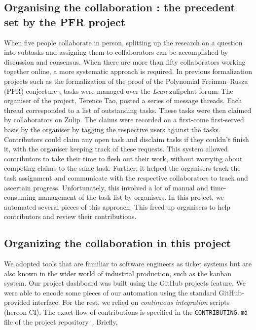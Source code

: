 \subsection{Organising the collaboration : the precedent set by the PFR project}
When five people collaborate in person, splitting up the research on a question into subtasks and assigning them to collaborators can be accomplished by discussion and consensus. When there are more than fifty collaborators working together online, a more systematic approach is required. In previous formalization projects such as the formalization of the proof of the Polynomial Freiman--Rusza (PFR) conjecture \cite{PFR_Tao_Dilles_2023}, tasks were managed over the \emph{Lean} zulipchat forum. The organiser of the project, Terence Tao, posted a series of message threads. Each thread corresponded to a list of outstanding tasks. These tasks were then claimed by collaborators on Zulip. The claims were recorded on a first-come first-served basis by the organiser by tagging the respective users against the tasks. Contributors could claim any open task and disclaim tasks if they couldn't finish it, with the organiser keeping track of these requests. This system allowed contributors to take their time to flesh out their work, without worrying about competing claims to the same task. Further, it helped the organisers track the task assignment and communicate with the respective collaborators to track and ascertain progress. Unfortunately, this involved a lot of manual and time-consuming management of the task list by organisers. In this project, we automated several pieces of this approach. This freed up organisers to help contributors and review their contributions.

\subsection{Organizing the collaboration in this project}
We adopted tools that are familiar to software engineers as ticket systems but are also known in the wider world of industrial production, such as the kanban system. Our project dashboard was built using the GitHub projects feature. We were able to encode some pieces of our automation using the standard GitHub-provided interface. For the rest, we relied on \emph{continuous integration} scripts (hereon CI\@). The exact flow of contributions is specified in the \texttt{CONTRIBUTING.md} file of the project repository~\cite{The_Equational_Theories_repository}. Briefly,


